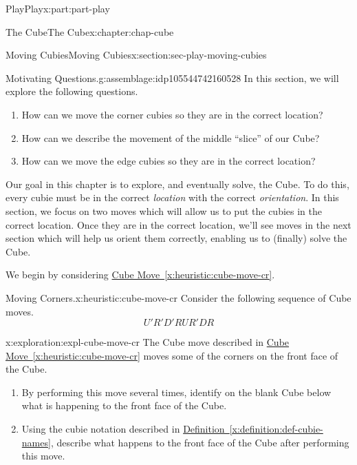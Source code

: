 \documentclass[oneside,10pt,]{book}
\newcommand{\xreffont}{\relax}
\numberwithin{equation}{section}
\begin{document}
\begin{partptx}{Play}{}{Play}{}{}{x:part:part-play}
\begin{chapterptx}{The Cube}{}{The Cube}{}{}{x:chapter:chap-cube}
%
\begin{sectionptx}{Moving Cubies}{}{Moving Cubies}{}{}{x:section:sec-play-moving-cubies}
\begin{assemblage}{Motivating Questions.}{g:assemblage:idp105544742160528}%
In this section, we will explore the following questions. %
\begin{enumerate}
\item{}How can we move the corner cubies so they are in the correct location?%
\item{}How can we describe the movement of the middle ``slice'' of our Cube?%
\item{}How can we move the edge cubies so they are in the correct location?%
\end{enumerate}
%
\end{assemblage}
\begin{introduction}{}%
Our goal in this chapter is to explore, and eventually solve, the Cube. To do this, every cubie must be in the correct \emph{location} with the correct \emph{orientation}. In this section, we focus on two moves which will allow us to put the cubies in the correct location. Once they are in the correct location, we'll see moves in the next section which will help us orient them correctly, enabling us to (finally) solve the Cube.%
\end{introduction}%
We begin by considering \hyperref[x:heuristic:cube-move-cr]{Cube Move~{\xreffont\ref{x:heuristic:cube-move-cr}}}.%
\begin{heuristic}{Moving Corners.}{}{x:heuristic:cube-move-cr}%
Consider the following sequence of Cube moves.%
%
\begin{equation*}
U' R' D' R U R' D R
\end{equation*}
\end{heuristic}
\begin{exploration}{}{x:exploration:expl-cube-move-cr}%
The Cube move described in \hyperref[x:heuristic:cube-move-cr]{Cube Move~{\xreffont\ref{x:heuristic:cube-move-cr}}} moves some of the corners on the front face of the Cube.%
%
\begin{enumerate}
\item{}By performing this move several times, identify on the blank Cube below what is happening to the front face of the Cube.%
\item{}Using the cubie notation described in \hyperref[x:definition:def-cubie-names]{Definition~{\xreffont\ref{x:definition:def-cubie-names}}}, describe what happens to the front face of the Cube after performing this move.%

\end{enumerate}
\end{exploration}
\end{sectionptx}
\end{chapterptx}
\end{partptx}
\end{document}
